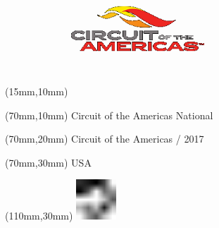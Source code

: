 \null\newpage
\begin{textblock*}{50mm}(15mm,10mm)%
\includegraphics[width=50mm]{LG/CIR.png}
\end{textblock*}
\begin{textblock*}{130mm}(70mm,10mm)%
{\fontsize{20}{20}\selectfont Circuit of the Americas National}\\
\end{textblock*}
\begin{textblock*}{120mm}(70mm,20mm)%
{\fontsize{16}{16}\selectfont Circuit of the Americas / 2017}\\
\end{textblock*}
\begin{textblock*}{120mm}(70mm,30mm)%
{\fontsize{12}{12}\selectfont USA}
\end{textblock*}
\begin{textblock*}{30mm}(110mm,30mm)%
\centering
\includegraphics[height=15mm]{icons/fa-rotate-left.pdf}
\end{textblock*}
